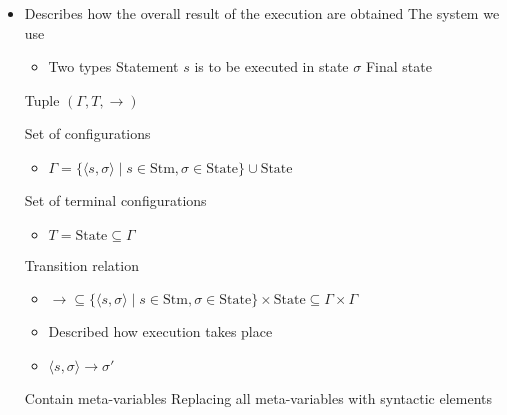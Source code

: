\begin{itemize}
    \item Describes how the overall result of the execution are obtained
     The system we use
        \begin{itemize}
                \begin{itemize}
                    \item Two types
                     Statement $s$ is to be executed in state $\sigma$
                     Final state
                \end{itemize}
             Tuple $(\Gamma, T, \to)$
                \begin{itemize}
                    \ides{$\mathbf{\Gamma}$:} Set of configurations
                        \begin{itemize}
                            \item $\Gamma = \{\langle s, \sigma \rangle \mid s \in \text{Stm}, \sigma \in \text{State}\} \cup \text{State}$
                        \end{itemize}
                     Set of terminal configurations
                        \begin{itemize}
                            \item $T = \text{State} \subseteq \Gamma$
                        \end{itemize}
                    \ides{$\mathbf{\to}$:} Transition relation
                        \begin{itemize}
                            \item $\to \subseteq \{\langle s, \sigma \rangle \mid s \in \text{Stm}, \sigma \in \text{State} \} \times \text{State} \subseteq \Gamma \times \Gamma$
                            \item Described how execution takes place
                            \item $\langle s, \sigma \rangle \to \sigma'$
                        \end{itemize}
                \end{itemize}
                \begin{itemize}
                     Contain meta-variables
                     Replacing all meta-variables with syntactic elements

\end{itemize}
\end{itemize}
\end{itemize}
